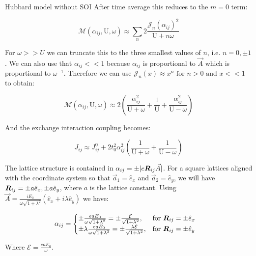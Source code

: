 \begin{section}{Hubbard model without SOI}
After time average this reduces to the $m=0$ term:

\begin{equation}
\label{MFactorApprox0}
\mathcal{M}(\alpha_{ij}, \text{U}, \omega) \approx \sum_{n} 2 \frac{\mathcal{J}_n(\alpha_{ij})^2}{\text{U}+n\omega}
\end{equation}

For $\omega>>U$ we can truncate this to the three smallest values of $n$, i.e. $n=0, \pm 1$. We can also use that $\alpha_{ij} << 1$ because $\alpha_{ij}$ is proportional to $\vec{A}$ which is proportional to $\omega^{-1}$. Therefore we can use $\mathcal{J}_n(x) \approx x^n \text{ for } n>0 \text{ and } x << 1$ to obtain:

\begin{equation}
\label{MFactorApprox}
\mathcal{M}(\alpha_{ij}, \text{U}, \omega) \approx 2 \left(\frac{\alpha_{ij}^2}{\text{U}+\omega} +\frac{1}{\text{U}} +\frac{\alpha_{ij}^2}{\text{U}-\omega} \right)
\end{equation}

And the exchange interaction coupling becomes:

\begin{equation}
\label{Jij2}
J_{ij} \approx J_{ij}^0 + 2t_0^2 \alpha_{ij}^2 \left( \frac{1}{\text{U}+\omega} + \frac{1}{\text{U}-\omega} \right)
\end{equation}

The lattice structure is contained in $\alpha_{ij} = \pm|e\boldsymbol{R}_{ij}\vec{A}|$. For a square lattices aligned with the coordinate system so that $\vec{a}_1=\hat{e}_x$ and $\vec{a}_2=\hat{e}_y$, we will have $\boldsymbol{R}_{ij} = \pm a\hat{e}_x,\pm a\hat{e}_y$, where $a$ is the lattice constant. Using $\vec{A}=\frac{iE_0}{\omega\sqrt{1+\lambda^2}}(\hat{e}_x+i\lambda\hat{e}_y)$ we have:

\begin{equation}
\alpha_{ij} = \begin{cases}
             \pm \frac{eaE_0}{\omega \sqrt{1+\lambda^2}} = \pm \frac{\mathcal{E}}{\sqrt{1+\lambda^2}},  & \text{for } \boldsymbol{R}_{ij} = \pm \hat{e}_x \\
             \pm \lambda\frac{eaE_0}{\omega \sqrt{1+\lambda^2}} = \pm \frac{\lambda \mathcal{E}}{\sqrt{1+\lambda^2}},  & \text{for } \boldsymbol{R}_{ij} = \pm \hat{e}_y
       \end{cases} \quad
\end{equation}

Where $\mathcal{E} = \frac{eaE_0}{\omega}$. 


\end{section}
